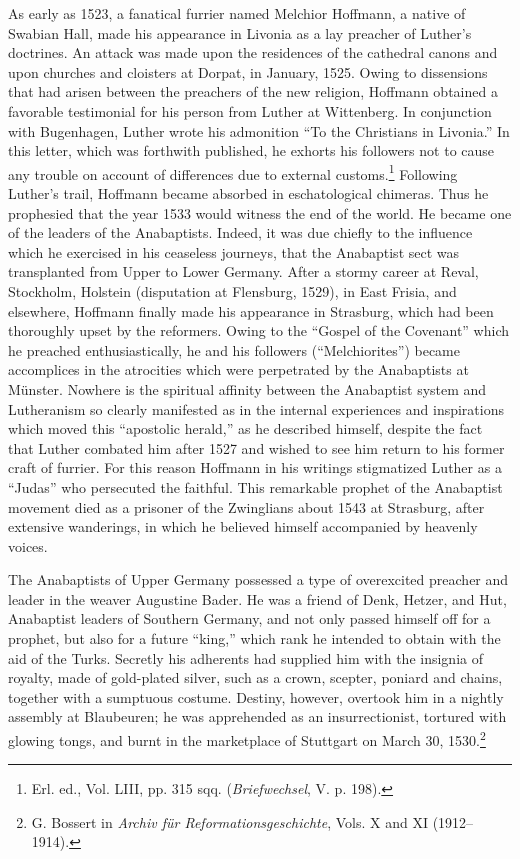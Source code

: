 As early as 1523, a fanatical furrier named Melchior Hoffmann,
a native of Swabian Hall, made his appearance in Livonia as a lay
preacher of Luther’s doctrines. An attack was made upon the residences
of the cathedral canons and upon churches and cloisters at
Dorpat, in January, 1525. Owing to dissensions that had arisen between
the preachers of the new religion, Hoffmann obtained a favorable testimonial
for his person from Luther at Wittenberg. In conjunction with Bugenhagen,
Luther wrote his admonition “To the
Christians in Livonia.” In this letter, which was forthwith published,
he exhorts his followers not to cause any trouble on account of differences
due to external customs.\footnote{Erl. ed., Vol. LIII, pp. 315 sqq. (\textit{Briefwechsel}, V. p. 198).}
Following Luther’s trail, Hoffmann
became absorbed in eschatological chimeras. Thus he prophesied that
the year 1533 would witness the end of the world. He became one
of the leaders of the Anabaptists. Indeed, it was due chiefly to the
influence which he exercised in his ceaseless journeys, that the Anabaptist
sect was transplanted from Upper to Lower Germany. After
a stormy career at Reval, Stockholm, Holstein (disputation at Flensburg,
1529), in East Frisia, and elsewhere, Hoffmann finally made
his appearance in Strasburg, which had been thoroughly upset by the
reformers. Owing to the “Gospel of the Covenant” which he preached
enthusiastically, he and his followers (“Melchiorites”) became accomplices
in the atrocities which were perpetrated by the Anabaptists
at Münster. Nowhere is the spiritual affinity between the Anabaptist
system and Lutheranism so clearly manifested as in the internal experiences
and inspirations which moved this “apostolic herald,” as he
described himself, despite the fact that Luther combated him after
1527 and wished to see him return to his former craft of furrier. For
this reason Hoffmann in his writings stigmatized Luther as a “Judas”
who persecuted the faithful. This remarkable prophet of the Anabaptist
movement died as a prisoner of the Zwinglians about 1543 at Strasburg,
after extensive wanderings, in which he believed himself accompanied by
heavenly voices.

The Anabaptists of Upper Germany possessed a type of overexcited preacher
and leader in the weaver Augustine Bader. He was a
friend of Denk, Hetzer, and Hut, Anabaptist leaders of Southern
Germany, and not only passed himself off for a prophet, but also for
a future “king,” which rank he intended to obtain with the aid of
the Turks. Secretly his adherents had supplied him with the insignia
of royalty, made of gold-plated silver, such as a crown, scepter,
poniard and chains, together with a sumptuous costume. Destiny,
however, overtook him in a nightly assembly at Blaubeuren; he was
apprehended as an insurrectionist, tortured with glowing tongs, and
burnt in the marketplace of Stuttgart on March 30, 1530.\footnote
{G. Bossert in \textit{Archiv für Reformationsgeschichte}, Vols. X and XI (1912--1914).}


